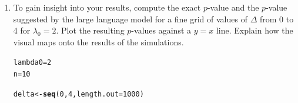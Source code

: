 \documentclass{article}\usepackage[]{graphicx}\usepackage[]{xcolor}
\makeatletter
\newcommand{\hlnum}[1]{\textcolor[rgb]{0.686,0.059,0.569}{#1}}%
\newcommand{\hlcom}[1]{\textcolor[rgb]{0.678,0.584,0.686}{\textit{#1}}}%
\newcommand{\hlopt}[1]{\textcolor[rgb]{0,0,0}{#1}}%
\newcommand{\hldef}[1]{\textcolor[rgb]{0.345,0.345,0.345}{#1}}%
\newcommand{\hlkwb}[1]{\textcolor[rgb]{0.69,0.353,0.396}{#1}}%
\newcommand{\hlkwc}[1]{\textcolor[rgb]{0.333,0.667,0.333}{#1}}%
\newcommand{\hlkwd}[1]{\textcolor[rgb]{0.737,0.353,0.396}{\textbf{#1}}}%
\newenvironment{kframe}{%
 \def\at@end@of@kframe{}%
 \ifinner\ifhmode%
  \def\at@end@of@kframe{\end{minipage}}%
  \begin{minipage}{\columnwidth}%
 \fi\fi%
 \def\FrameCommand##1{\hskip\@totalleftmargin \hskip-\fboxsep
 \colorbox{shadecolor}{##1}\hskip-\fboxsep
     \hskip-\linewidth \hskip-\@totalleftmargin \hskip\columnwidth}%
 \MakeFramed {\advance\hsize-\width
   \@totalleftmargin\z@ \linewidth\hsize
   \@setminipage}}%
 {\par\unskip\endMakeFramed%
 \at@end@of@kframe}
\newenvironment{knitrout}{}{} %
\makeatother
\begin{document}
\begin{enumerate}
\begin{enumerate}
\begin{enumerate}
\begin{knitrout}
\begin{kframe}
\begin{alltt}
  \hlcom{#part v}
  \hldef{exact_p} \hlkwb{=} \hldef{pL} \hlopt{+} \hldef{pU}
  \hldef{exact_power[i]} \hlkwb{=} \hlkwd{ifelse}\hldef{(exact_p} \hlopt{<} \hlnum{0.05}\hldef{,} \hlnum{1}\hldef{,} \hlnum{0}\hldef{)}

  \hlcom{#part vi}
  \hldef{LLM_lower} \hlkwb{=} \hlkwd{pgamma}\hldef{(}\hlkwd{mean}\hldef{(rsamp),} \hlkwc{shape} \hldef{= n,} \hlkwc{rate} \hldef{= n}\hlopt{/}\hldef{lambda0)}
  \hldef{LLM_upper} \hlkwb{=} \hlnum{1} \hlopt{-} \hlkwd{pgamma}\hldef{(}\hlkwd{mean}\hldef{(rsamp),} \hlkwc{shape} \hldef{= n,} \hlkwc{rate} \hldef{= n}\hlopt{/}\hldef{lambda0)}
  \hldef{LLM_p} \hlkwb{=} \hlnum{2}\hlopt{*}\hlkwd{min}\hldef{(LLM_lower, LLM_upper)}
  \hldef{LLM_power[i]} \hlkwb{=} \hlkwd{ifelse}\hldef{(LLM_p} \hlopt{<} \hlnum{0.05}\hldef{,} \hlnum{1}\hldef{,} \hlnum{0}\hldef{)}

\hldef{\}}

\hldef{(}\hlkwd{mean}\hldef{(exact_power))}
\end{alltt}
\begin{verbatim}
## [1] 0.1125
\end{verbatim}
\begin{alltt}
\hldef{(}\hlkwd{mean}\hldef{(LLM_power))}
\end{alltt}
\begin{verbatim}
## [1] 0.0853
\end{verbatim}
\end{kframe}
\end{knitrout}

\textcolor{red}{The power of our exact method is 0.1125. The power of the LLM approximation is 0.0853.}

\end{enumerate}
\item To gain insight into your results, compute the exact $p$-value and
the $p$-value suggested by the large language model for a fine grid of
values of $\Delta$ from 0 to 4 for $\lambda_0=2$. Plot the resulting $p$-values against
a $y=x$ line. Explain how the visual maps onto the results of the simulations.

\begin{knitrout}\scriptsize
{}\color{fgcolor}\begin{kframe}
\begin{alltt}
\hldef{lambda0} \hlkwb{=} \hlnum{2}
\hldef{n} \hlkwb{=} \hlnum{10}

\hldef{delta} \hlkwb{<-} \hlkwd{seq}\hldef{(}\hlnum{0}\hldef{,}\hlnum{4}\hldef{,}\hlkwc{length.out} \hldef{=} \hlnum{1000}\hldef{)}


\end{alltt}
\end{kframe}
\end{knitrout}
\end{enumerate}
\end{enumerate}
\end{document}
